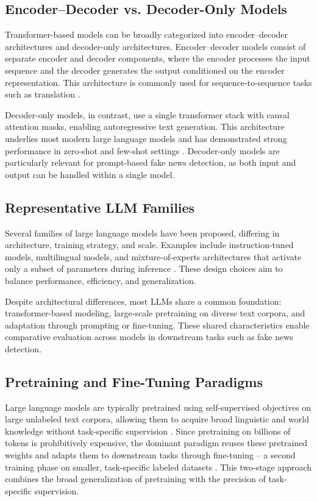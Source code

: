 \subsection{Encoder--Decoder vs. Decoder-Only Models}

Transformer-based models can be broadly categorized into encoder--decoder architectures and decoder-only architectures. Encoder--decoder models consist of separate encoder and decoder components, where the encoder processes the input sequence and the decoder generates the output conditioned on the encoder representation. This architecture is commonly used for sequence-to-sequence tasks such as translation \cite{zhao2025surveylargelanguagemodels}.

Decoder-only models, in contrast, use a single transformer stack with causal attention masks, enabling autoregressive text generation. This architecture underlies most modern large language models and has demonstrated strong performance in zero-shot and few-shot settings \cite{naveed2024comprehensiveoverviewlargelanguage}. Decoder-only models are particularly relevant for prompt-based fake news detection, as both input and output can be handled within a single model.

\subsection{Representative LLM Families}

Several families of large language models have been proposed, differing in architecture, training strategy, and scale. Examples include instruction-tuned models, multilingual models, and mixture-of-experts architectures that activate only a subset of parameters during inference \cite{naveed2024comprehensiveoverviewlargelanguage}. These design choices aim to balance performance, efficiency, and generalization.

Despite architectural differences, most LLMs share a common foundation: transformer-based modeling, large-scale pretraining on diverse text corpora, and adaptation through prompting or fine-tuning. These shared characteristics enable comparative evaluation across models in downstream tasks such as fake news detection.

\subsection{Pretraining and Fine-Tuning Paradigms}

Large language models are typically pretrained using self-supervised objectives on large unlabeled text corpora, allowing them to acquire broad linguistic and world knowledge without task-specific supervision \cite{zhao2025surveylargelanguagemodels}. Since pretraining on billions of tokens is prohibitively expensive, the dominant paradigm reuses these pretrained weights and adapts them to downstream tasks through fine-tuning -- a second training phase on smaller, task-specific labeled datasets \cite{naveed2024comprehensiveoverviewlargelanguage}. This two-stage approach combines the broad generalization of pretraining with the precision of task-specific supervision.

